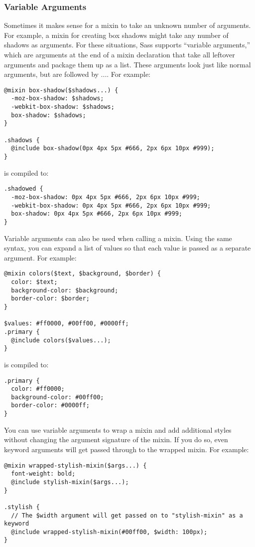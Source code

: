 \documentclass[9pt]{article}
\begin{document}
\subsubsection{Variable Arguments}


 Sometimes it makes sense for a mixin to take an unknown number of arguments. For example, a mixin for creating box shadows might take any number of shadows as arguments. For these situations, Sass supports “variable arguments,” which are arguments at the end of a mixin declaration that take all leftover arguments and package them up as a list. These arguments look just like normal arguments, but are followed by .... For example:
\begin{verbatim}
@mixin box-shadow($shadows...) {
  -moz-box-shadow: $shadows;
  -webkit-box-shadow: $shadows;
  box-shadow: $shadows;
}

.shadows {
  @include box-shadow(0px 4px 5px #666, 2px 6px 10px #999);
}
\end{verbatim}


 is compiled to:
\begin{verbatim}
.shadowed {
  -moz-box-shadow: 0px 4px 5px #666, 2px 6px 10px #999;
  -webkit-box-shadow: 0px 4px 5px #666, 2px 6px 10px #999;
  box-shadow: 0px 4px 5px #666, 2px 6px 10px #999;
}
\end{verbatim}


 Variable arguments can also be used when calling a mixin. Using the same syntax, you can expand a list of values so that each value is passed as a separate argument. For example:
\begin{verbatim}
@mixin colors($text, $background, $border) {
  color: $text;
  background-color: $background;
  border-color: $border;
}

$values: #ff0000, #00ff00, #0000ff;
.primary {
  @include colors($values...);
}
\end{verbatim}


 is compiled to:
\begin{verbatim}
.primary {
  color: #ff0000;
  background-color: #00ff00;
  border-color: #0000ff;
}
\end{verbatim}


 You can use variable arguments to wrap a mixin and add additional styles without changing the argument signature of the mixin. If you do so, even keyword arguments will get passed through to the wrapped mixin. For example:
\begin{verbatim}
@mixin wrapped-stylish-mixin($args...) {
  font-weight: bold;
  @include stylish-mixin($args...);
}

.stylish {
  // The $width argument will get passed on to "stylish-mixin" as a keyword
  @include wrapped-stylish-mixin(#00ff00, $width: 100px);
}
\end{verbatim}
\end{document}
